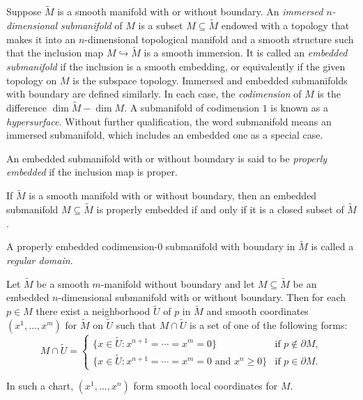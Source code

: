 Suppose $\tilde{M}$ is a smooth manifold with or without boundary. An \emph{immersed $n$-dimensional submanifold} of $M$ is a subset $M \subseteq \tilde{M}$ endowed with a topology that makes it into an $n$-dimensional topological manifold and a smooth structure such that the inclusion map $M \hookrightarrow \tilde{M}$ is a smooth immersion. It is called an \emph{embedded submanifold} if the inclusion is a smooth embedding, or equivalently if the given topology on $M$ is the subspace topology. Immersed and embedded submanifolds with boundary are defined similarly. In each case, the \emph{codimension} of $M$ is the difference $\dim \tilde{M} - \dim M$. A submanifold of codimension $1$ is known as a \emph{hypersurface}. Without further qualification, the word submanifold means an immersed submanifold, which includes an embedded one as a special case.

An embedded submanifold with or without boundary is said to be \emph{properly embedded} if the inclusion map is proper.

\begin{proposition}
\label{prop:properly-embedded-closed}
If $\tilde{M}$ is a smooth manifold with or without boundary, then an embedded submanifold $M \subseteq \tilde{M}$ is properly embedded if and only if it is a closed subset of $\tilde{M}$.
\end{proposition}

A properly embedded codimension-$0$ submanifold with boundary in $\tilde{M}$ is called a \emph{regular domain}.

\begin{proposition}
\label{prop:slice-coordinates}
Let $\tilde{M}$ be a smooth $m$-manifold without boundary and let $M \subseteq \tilde{M}$ be an embedded $n$-dimensional submanifold with or without boundary. Then for each $p \in M$ there exist a neighborhood $\tilde{U}$ of $p$ in $\tilde{M}$ and smooth coordinates $(x^1, \ldots, x^m)$ for $\tilde{M}$ on $\tilde{U}$ such that $M \cap \tilde{U}$ is a set of one of the following forms:
\[
M \cap \tilde{U} = \begin{cases}
\{x \in \tilde{U} : x^{n+1} = \cdots = x^m = 0\} & \text{if } p \notin \partial M, \\
\{x \in \tilde{U} : x^{n+1} = \cdots = x^m = 0 \text{ and } x^n \geq 0\} & \text{if } p \in \partial M.
\end{cases}
\]

In such a chart, $(x^1, \ldots, x^n)$ form smooth local coordinates for $M$.
\end{proposition}

